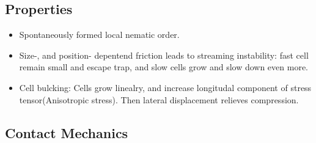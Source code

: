 \documentclass[10pt,a4paper]{article}
\begin{document}
\subsection{Properties}
\begin{itemize}
 \item Spontaneously formed local nematic order.
 \item Size-, and position- depentend friction leads to streaming instability: fast cell remain small and escape trap, and slow cells grow and slow down even more.
 \item Cell bulcking: Cells grow linealry, and increase longitudal component of stress tensor(Anisotropic stress). 
 Then lateral displacement relieves compression.
\end{itemize}

\subsection{Contact Mechanics}
\end{document}
